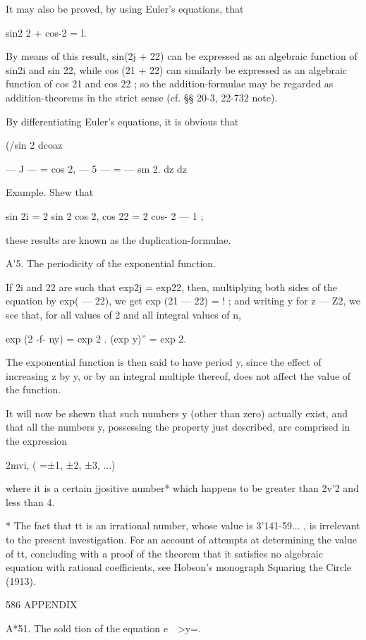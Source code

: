 It may also be proved, by using Euler's equations, that 

sin2 2 + cos-2 = l. 

By means of this result, sin(2j + 22) can be expressed as an algebraic function of sin2i 
and sin 22, while cos (21 + 22) can similarly be expressed as an algebraic function of cos 21 
and cos 22 ; so the addition-formulae may be regarded as addition-theorems in the strict 
sense (cf. §§ 20-3, 22-732 note). 

By differentiating Euler's equations, it is obvious that 

(/sin 2 dcoaz 

— J — = cos 2, — 5 — = — sm 2. 
dz dz 

Example. Shew that 

sin 2i = 2 sin 2 cos 2, cos 22 = 2 cos- 2 — 1 ; 

these results are known as the duplication-formulae. 

A'5. The periodicity of the exponential function. 

If 2i and 22 are such that exp2j = exp22, then, multiplying both sides of the equation by 
exp( — 22), we get exp (21 — 22) = ! ; and writing y for z  — Z2, we see that, for all values of 2 
and all integral values of n, 

exp (2 -f- ny) = exp 2 . (exp y)'' = exp 2. 

The exponential function is then said to have period y, since the effect of increasing 
z by y, or by an integral multiple thereof, does not affect the value of the function. 

It will now be shewn that such numbers y (other than zero) actually exist, and that all 
the numbers y, possessing the property just described, are comprised in the expression 

2mvi, ( =±1, ±2, ±3, ...) 

where it is a certain jjositive number* which happens to be greater than 2v'2 and less 
than 4. 

* The fact that tt is an irrational number, whose value is 3'141-59... , is irrelevant to the 
present investigation. For an account of attempts at determining the value of tt, concluding 
with a proof of the theorem that it satisfies no algebraic equation with rational coefficients, see 
Hobson's monograph Squaring the Circle (1913). 



586 APPENDIX 

A*51. The sold tion of the equation e\ \ >y=.  

